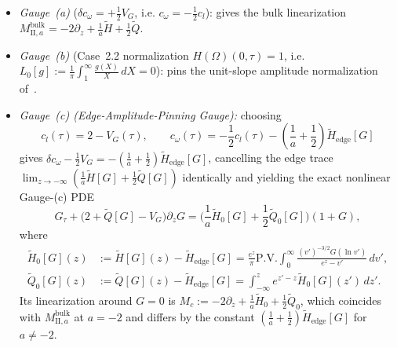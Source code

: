 \documentclass[11pt,a4paper]{article}
\begin{document}
\begin{itemize}
  \item \emph{Gauge~(a)} ($\delta c_\omega = +\frac{1}{2}V_G$, i.e. $c_\omega = -\frac{1}{2}c_l$): gives the bulk linearization $M_{\mathrm{II},a}^{\mathrm{bulk}} = -2\partial_z + \frac{1}{a}\widetilde{H} + \frac{1}{2}\widetilde{Q}$.
  \item \emph{Gauge~(b)} (Case~2.2 normalization $H(\Omega)(0,\tau) = 1$, i.e. $L_0[g] := \frac{1}{\pi}\int_1^\infty \frac{g(X)}{X}\,dX = 0$): pins the unit-slope amplitude normalization of~\cite{HuangTongWang2026}.
  \item \emph{Gauge~(c) (Edge-Amplitude-Pinning Gauge):} choosing
  \begin{equation}\label{eq:gauge_c}
  c_l(\tau) = 2 - V_G(\tau), \qquad c_\omega(\tau) = -\frac{1}{2}c_l(\tau) - \left(\frac{1}{a} + \frac{1}{2}\right)\widetilde{H}_{\mathrm{edge}}[G]
  \end{equation}
  gives $\delta c_\omega - \frac{1}{2}V_G = -(\frac{1}{a} + \frac{1}{2})\widetilde{H}_{\mathrm{edge}}[G]$, cancelling the edge trace $\lim_{z\to-\infty}(\frac{1}{a}\widetilde{H}[G] + \frac{1}{2}\widetilde{Q}[G])$ identically and yielding the exact nonlinear Gauge-(c) PDE
  \begin{equation}\label{eq:nonlin_gauge_c}
  G_\tau + \big(2 + \widetilde{Q}[G] - V_G\big)\partial_z G = \Big(\frac{1}{a}\widetilde{H}_0[G] + \frac{1}{2}\widetilde{Q}_0[G]\Big)(1 + G),
  \end{equation}
  where
  \begin{align*}
  \widetilde{H}_0[G](z) &:= \widetilde{H}[G](z) - \widetilde{H}_{\mathrm{edge}}[G] = \frac{e^z}{\pi}\mathrm{P.V.}\int_0^\infty \frac{(v')^{-3/2}G(\ln v')}{e^z - v'}\,dv', \\
  \widetilde{Q}_0[G](z) &:= \widetilde{Q}[G](z) - \widetilde{H}_{\mathrm{edge}}[G] = \int_{-\infty}^z e^{z'-z}\widetilde{H}_0[G](z')\,dz'.
  \end{align*}
  Its linearization around $G = 0$ is $M_c := -2\partial_z + \frac{1}{a}\widetilde{H}_0 + \frac{1}{2}\widetilde{Q}_0$, which coincides with $M_{\mathrm{II},a}^{\mathrm{bulk}}$ at $a = -2$ and differs by the constant $(\frac{1}{a} + \frac{1}{2})\widetilde{H}_{\mathrm{edge}}[G]$ for $a \ne -2$.
\end{itemize}
\end{document}
